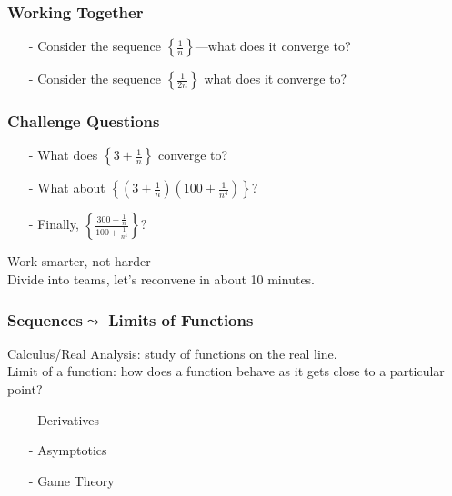 \documentclass{beamer}
\numberwithin{equation}{section}
\begin{document}
\begin{frame}
\frametitle{Working Together}
\begin{itemize}
 \item[-] Consider the sequence $\left\{\frac{1}{n} \right\}$---what does it converge to?  
\item[-] Consider the sequence $\left\{\frac{1}{2n} \right \}$ what does it converge to?
\end{itemize}
\end{frame}



\begin{frame}
\frametitle{Challenge Questions}
\begin{itemize}
\item[-] What does $\left\{3 + \frac{1}{n}\right\}$ converge to?
\item[-] What about $\left\{ (3 + \frac{1}{n} ) (100  + \frac{1}{n^4} ) \right\}$?
\item[-] Finally, $\left\{ \frac{ 300 + \frac{1}{n} }{100  + \frac{1}{n^4}} \right\}$?
\end{itemize}

\alert{Work smarter, not harder}\\
Divide into teams, let's reconvene in about 10 minutes.  

\end{frame}


\begin{frame}
\frametitle{Sequences$\leadsto$ Limits of Functions}

\alert{Calculus/Real Analysis}: study of functions on the \alert{real line}.\\
\alert{Limit of a function}: how does a function behave as it gets close to a particular point?  
\begin{itemize}
\item[-] Derivatives
\item[-] Asymptotics 
\item[-] Game Theory 
\end{itemize}

\end{frame}
\end{document}

